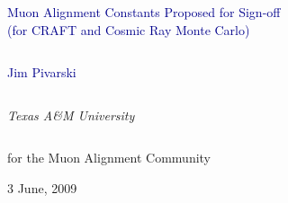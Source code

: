 \documentclass[compress]{beamer}
\begin{document}
\begin{frame}
\vfill
\begin{center}
\textcolor{darkblue}{\Large Muon Alignment Constants Proposed for Sign-off \\ \vspace{0.2 cm}(for CRAFT and Cosmic Ray Monte Carlo)}

\vfill
\begin{columns}
\begin{center}
\large
\textcolor{darkblue}{Jim Pivarski}
\end{center}
\end{columns}

\begin{columns}
\begin{center}
\scriptsize
{\it Texas A\&M University}
\end{center}
\end{columns}

\vspace{0.5 cm}
for the Muon Alignment Community

\vfill
 3 June, 2009

\end{center}
\end{frame}


\small
\end{document}
